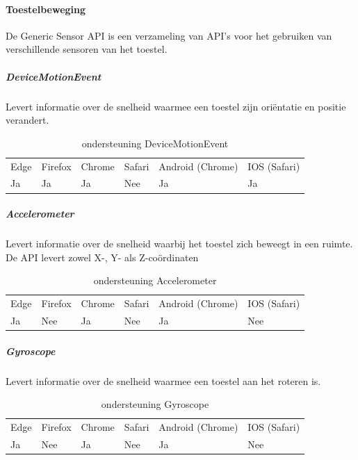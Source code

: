 \paragraph{Toestelbeweging}
De Generic Sensor API \autocite{Waldroon2020} is een verzameling van API’s voor het gebruiken van verschillende sensoren van het toestel.

	\subparagraph{DeviceMotionEvent }
	Levert informatie over de snelheid waarmee een toestel zijn oriëntatie en positie verandert.
	
	\begin{table}[H]
		\centering
		\begin{tabular}{llllll}
			Edge & Firefox & Chrome & Safari & Android (Chrome) & IOS (Safari) \\
			Ja   & Ja      &  Ja   & Nee     & Ja               & Ja          
		\end{tabular}	
		\caption{ondersteuning	DeviceMotionEvent  }
		\label{ondersteuning DeviceMotionEvent  }
	\end{table} 
	
	
	\subparagraph{Accelerometer  }
		Levert informatie over de snelheid waarbij het toestel zich beweegt in een ruimte. De API levert zowel X-, Y- als Z-coördinaten
		
		\begin{table}[H]
			\centering
			\begin{tabular}{llllll}
				Edge & Firefox & Chrome & Safari & Android (Chrome) & IOS (Safari) \\
				Ja   & Nee      &  Ja   & Nee     & Ja               & Nee          
			\end{tabular}	
			\caption{ondersteuning	Accelerometer   }
			\label{ondersteuning Accelerometer  }
		\end{table}
		
		
		
	\subparagraph{Gyroscope  }
		Levert informatie over de snelheid waarmee een toestel aan het roteren is. 
			
		\begin{table}[H]
			\centering
			\begin{tabular}{llllll}
				Edge & Firefox & Chrome & Safari & Android (Chrome) & IOS (Safari) \\
				Ja   & Nee      &  Ja   & Nee     & Ja               & Nee          
			\end{tabular}	
			\caption{ondersteuning Gyroscope  }
			\label{ondersteuning Gyroscope   }
		\end{table}
			

